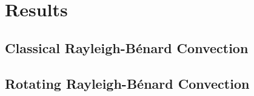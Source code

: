 \documentclass[aps, pre, onecolumn, nofootinbib, notitlepage, groupedaddress, amsfonts, amssymb, amsmath, longbibliography]{revtex4-1}
\newcommand{\RB}{Rayleigh-B\'{e}nard }
\begin{document}
\section{Results}
\label{sec:results}

\subsection{Classical \RB Convection}
\label{sec:2d_results}



\subsection{Rotating \RB Convection}
\label{sec:rotating_results}


\end{document}
